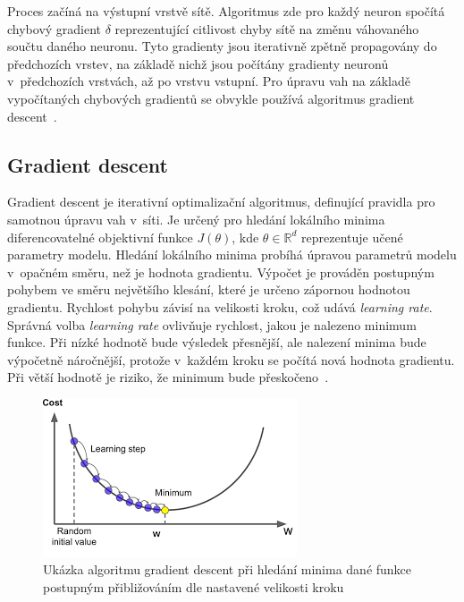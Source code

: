 Proces začíná na výstupní vrstvě sítě. Algoritmus zde pro každý neuron spočítá chybový gradient $\delta$ reprezentující citlivost chyby sítě na změnu váhovaného součtu daného neuronu. Tyto gradienty jsou iterativně zpětně propagovány do předchozích vrstev, na základě nichž jsou počítány gradienty neuronů v~předchozích vrstvách, až po vrstvu vstupní. Pro úpravu vah na základě vypočítaných chybových gradientů se obvykle používá algoritmus gradient descent~\cite{mitdeeplearning_small}.




\subsection*{Gradient descent}
Gradient descent je iterativní optimalizační algoritmus, definující pravidla pro samotnou úpravu vah v~síti. Je určený pro hledání lokálního minima diferencovatelné objektivní funkce $J(\theta)$, kde $\theta \in \mathbb{R}^d$ reprezentuje učené parametry modelu. Hledání lokálního minima probíhá úpravou parametrů modelu v~opačném směru, než je hodnota gradientu. Výpočet je prováděn postupným pohybem ve směru největšího klesání, které je určeno zápornou hodnotou gradientu. Rychlost pohybu závisí na velikosti kroku, což udává \textit{learning rate}. Správná volba \textit{learning rate} ovlivňuje rychlost, jakou je nalezeno minimum funkce. Při nízké hodnotě bude výsledek přesnější, ale nalezení minima bude výpočetně náročnější, protože v~každém kroku se počítá nová hodnota gradientu. Při větší hodnotě je riziko, že minimum bude přeskočeno~\cite{ruder2016overview}.
\begin{figure}[H]
    \centering
    \includegraphics[scale=0.7]{obrazky-figures/gradientdescent.png}
    \caption{\label{fig:gradientdescent}Ukázka algoritmu gradient descent při hledání minima dané funkce postupným přibližováním dle nastavené velikosti kroku}
\end{figure}

